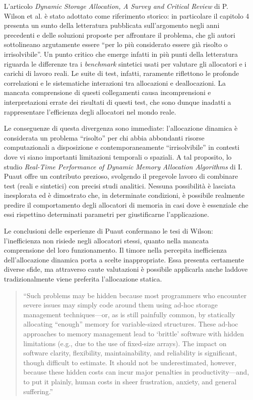 L’articolo \textit{Dynamic Storage Allocation, A Survey and Critical Review} di P. Wilson et al. è stato adottato come riferimento storico: in particolare il capitolo 4 presenta un sunto della letteratura pubblicata sull’argomento negli anni precedenti e delle soluzioni proposte per affrontare il problema, che gli autori sottolineano argutamente essere ``per lo più considerato essere già risolto o irrisolvibile''. Un punto critico che emerge infatti in più punti della letteratura riguarda le differenze tra i \textit{benchmark} sintetici usati per valutare gli allocatori e i carichi di lavoro reali. Le suite di test, infatti, raramente riflettono le profonde correlazioni e le sistematiche interazioni tra allocazioni e deallocazioni. La mancata comprensione di questi collegamenti causa incomprensioni e interpretazioni errate dei risultati di questi test, che sono dunque inadatti a rappresentare l’efficienza degli allocatori nel mondo reale.

Le conseguenze di questa divergenza sono immediate: l’allocazione dinamica è considerata un problema ``risolto'' per chi abbia abbondanti risorse computazionali a disposizione e contemporaneamente ``irrisolvibile'' in contesti dove vi siano importanti limitazioni temporali o spaziali. A tal proposito, lo studio \textit{Real-Time Performance of Dynamic Memory Allocation Algorithms} di I. Puaut offre un contributo prezioso, svolgendo il pregevole lavoro di combinare test (reali e sintetici) con precisi studi analitici. Nessuna possibilità è lasciata inesplorata ed è dimostrato che, in determinate condizioni, è possibile realmente predire il comportamento degli allocatori di memoria in casi dove è essenziale che essi rispettino determinati parametri per giustificarne l’applicazione.

Le conclusioni delle esperienze di Puaut confermano le tesi di Wilson: l’inefficienza non risiede negli allocatori stessi, quanto nella mancata comprensione del loro funzionamento. Il timore nella percepita inefficienza dell’allocazione dinamica porta a scelte inappropriate. Essa presenta certamente diverse sfide, ma attraverso caute valutazioni è possibile applicarla anche laddove tradizionalmente viene preferita l’allocazione statica.

\begin{quote}
``Such problems may be hidden because most programmers who encounter severe issues may simply code around them using ad-hoc storage management techniques---or, as is still painfully common, by statically allocating ``enough'' memory for variable-sized structures. These ad-hoc approaches to memory management lead to `brittle' software with hidden limitations (e.g., due to the use of fixed-size arrays). The impact on software clarity, flexibility, maintainability, and reliability is significant, though difficult to estimate. It should not be underestimated, however, because these hidden costs can incur major penalties in productivity---and, to put it plainly, human costs in sheer frustration, anxiety, and general suffering.''
\end{quote}

